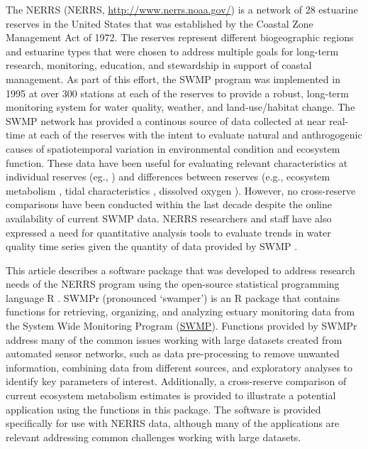 \documentclass[10pt,letterpaper]{article}\usepackage[]{graphicx}\usepackage[]{color}
\begin{document}
The \acl{NERRS} (\acs{NERRS}, \url{http://www.nerrs.noaa.gov/}) is a network of 28 estuarine reserves in the United States that was established by the Coastal Zone Management Act of 1972.  The reserves represent different biogeographic regions and estuarine types that were chosen to address multiple goals for long-term research, monitoring, education, and stewardship in support of coastal management.  As part of this effort, the \acf{SWMP} program was implemented in 1995 at over 300 stations at each of the reserves to provide a robust, long-term monitoring system for water quality, weather, and land-use/habitat change.  The \ac{SWMP} network has provided a continous source of data collected at near real-time at each of the reserves with the intent to evaluate natural and anthrogogenic causes of spatiotemporal variation in environmental condition and ecosystem function.  These data have been useful for evaluating relevant characteristics at individual reserves (eg., \cite{Bulthius95,Dix08}) and differences between reserves (e.g., ecosystem metabolism \cite{Caffrey03,Caffrey04}, tidal characteristics \cite{Sanger02}, dissolved oxygen \cite{Wenner04}).  However, no cross-reserve comparisons have been conducted within the last decade despite the online availability of current \ac{SWMP} data.  \ac{NERRS} researchers and staff have also expressed a need for quantitative analysis tools to evaluate trends in water quality time series given the quantity of data provided by \ac{SWMP} \cite{SWMP14}.          

This article describes a software package that was developed to address research needs of the \ac{NERRS} program using the open-source statistical programming language R \cite{RDCT14}.  SWMPr (pronounced `swamper') is an R package that contains functions for retrieving, organizing, and analyzing estuary monitoring data from the System Wide Monitoring Program (\href{http://nerrs.noaa.gov/RCDefault.aspx?ID=18}{SWMP}).  Functions provided by SWMPr address many of the common issues working with large datasets created from automated sensor networks, such as data pre-processing to remove unwanted information, combining data from different sources, and exploratory analyses to identify key parameters of interest.  Additionally, a cross-reserve comparison of current ecosystem metabolism estimates is provided to illustrate a potential application using the functions in this package.  The software is provided specifically for use with \ac{NERRS} data, although many of the applications are relevant addressing common challenges working with large datasets.
\end{document}
